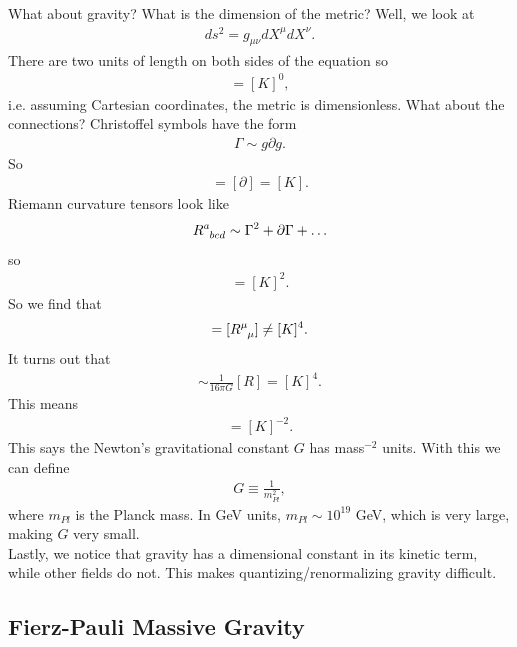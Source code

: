 \documentclass{book}
\theoremstyle{definition}
\newcommand{\p}{\partial}
\newcommand{\lag}{\mathcal{L}}
\newcommand{\f}[2]{\frac{#1}{#2}}
\begin{document}
What about gravity? What is the dimension of the metric? Well, we look at
\begin{align}
ds^2 = g_{\mu\nu}dX^\mu dX^\nu.
\end{align}
There are two units of length on both sides of the equation so
\begin{align}
[g_{\mu\nu}] = [K]^0,
\end{align}
i.e. assuming Cartesian coordinates, the metric is dimensionless. What about the connections? Christoffel symbols have the form
\begin{align}
\Gamma \sim g \p g.
\end{align}
So 
\begin{align}
[\Gamma] = [\p] = [K].
\end{align}
Riemann curvature tensors look like
\begin{align}
\tensor{R}{^a_{bcd}} \sim \Gamma^2 + \p \Gamma + \dots
\end{align}
so 
\begin{align}
[\tensor{R}{^a_{bcd}}] = [K]^2.
\end{align}
So we find that 
\begin{align}
[\lag_{grav}] = [\tensor{R}{^\mu_\mu}] \neq [K]^4.
\end{align}
It turns out that
\begin{align}
[\lag] \sim \f{1}{16\pi G}[R] = [K]^4.
\end{align}
This means 
\begin{align}
[G] = [K]^{-2}.
\end{align}
This says the Newton's gravitational constant $G$ has mass$^{-2}$ units. With this we can define
\begin{align}
G \equiv \f{1}{m^2_{Pl}},
\end{align}
where $m_{Pl}$ is the Planck mass. In GeV units, $m_{Pl} \sim 10^{19}$ GeV, which is very large, making $G$ very small. \\

Lastly, we notice that gravity has a dimensional constant in its kinetic term, while other fields do not. This makes quantizing/renormalizing gravity difficult. 











\newpage
\subsection{Fierz-Pauli Massive Gravity}
\end{document}
